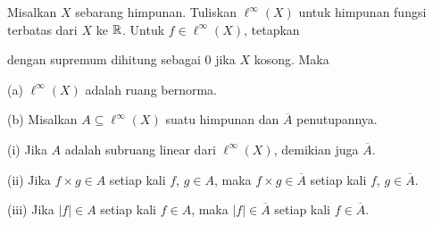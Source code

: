  Misalkan $X$ sebarang himpunan. Tuliskan
$\ell^{\infty}(X)$ untuk himpunan fungsi terbatas dari $X$ ke $\Bbb R$. Untuk
$f\in\ell^{\infty}(X)$, tetapkan
      
      
\noindent dengan supremum dihitung sebagai $0$ jika $X$ kosong. Maka
      
(a) $\ell^{\infty}(X)$ adalah ruang bernorma.
      
(b) Misalkan $A\subseteq\ell^{\infty}(X)$ suatu himpunan dan
$\overline{A}$ penutupannya.
      
\quad (i) Jika $A$ adalah subruang linear dari $\ell^{\infty}(X)$, demikian
juga $\overline{A}$.
      
\quad (ii) Jika $f\times g\in A$ setiap kali $f$, $g\in A$, maka
$f\times g\in\overline{A}$ setiap kali $f$, $g\in\overline{A}$.
      
\quad (iii) Jika $|f|\in A$ setiap kali $f\in A$, maka $|f|\in\overline{A}$
setiap kali $f\in\overline{A}$.
      
